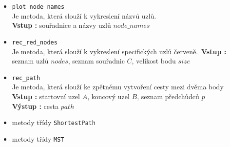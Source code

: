\begin{itemize}
    \item \texttt{plot\_node\_names}\\
    Je metoda, která slouží k vykreslení názvů uzlů.\\
    \textbf{Vstup : } souřadnice a názvy uzlů $node\_names$
    
    \item \texttt{rec\_red\_nodes}\\
    Je metoda, která slouží k vykreslení specifických uzlů červeně.\
    \textbf{Vstup : } seznam uzlů $nodes$, seznam souřadnic $C$, velikost bodu $size$
    
    \item \texttt{rec\_path}\\
    Je metoda, která slouží ke zpětnému vytvoření cesty mezi dvěma body\\
    \textbf{Vstup : } startovní uzel $A$, koncový uzel $B$, seznam předchůdců $p$\\
    \textbf{Výstup : } cesta $path$
    
    \item metody třídy \texttt{ShortestPath}
    \item metody třídy \texttt{MST}
\end{itemize}